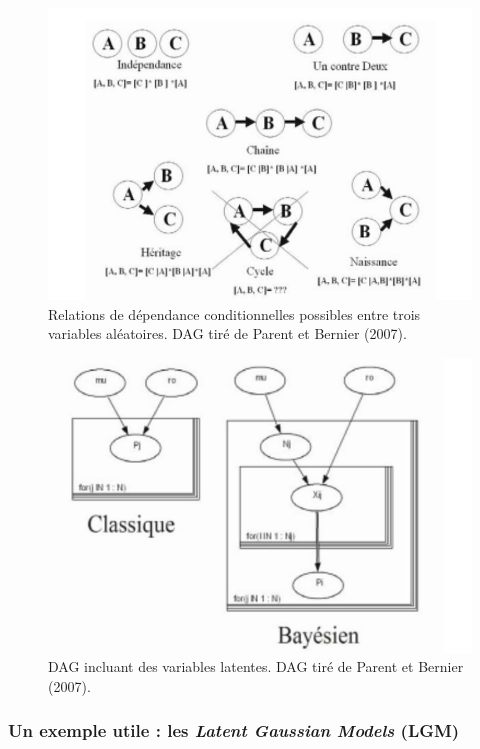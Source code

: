 \begin{figure}[h!]
\centering
\includegraphics[scale=0.4]{figures/prior/parent2.jpeg}
\caption{Relations de dépendance conditionnelles possibles entre trois variables aléatoires. DAG tiré de Parent et Bernier (2007). }
\label{DAG2}
\end{figure}


\begin{figure}[h!]
\centering
\includegraphics[scale=0.4]{figures/prior/parent3.jpeg}
\caption{DAG incluant des variables latentes. DAG tiré de Parent et Bernier (2007). }
\label{DAG3}
\end{figure}

\subsubsection{Un exemple utile : les \emph{Latent Gaussian Models} (LGM)}

